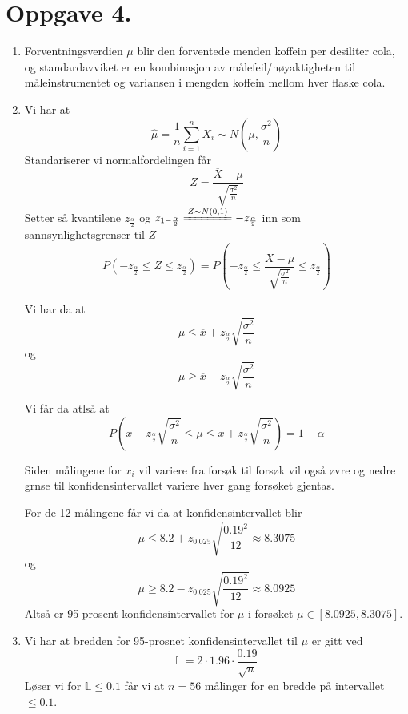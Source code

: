 \documentclass[a4paper,11pt,norsk]{article}
\begin{document}
\section*{Oppgave 4.}
\begin{enumerate}
    \item Forventningsverdien $\mu$ blir den forventede menden koffein per desiliter cola, og standardavviket er en kombinasjon 
        av målefeil/nøyaktigheten til måleinstrumentet og variansen i mengden koffein mellom hver flaske cola.

    \item Vi har at 
        \[
            \hat{\mu} = \frac{1}{n} \sum_{i=1}^{n}{X_i} \sim N\left(\mu, \frac{\sigma^2}{n}\right)
        \]
        Standariserer vi normalfordelingen får 
        \[
            Z = \frac{\overline{X} - \mu}{\sqrt{\frac{\sigma^2}{n}}}
        \]
        Setter så kvantilene $z_{\frac{\alpha}{2}}$ og $z_{1-\frac{\alpha}{2}} \xlongequal{Z \sim N(0, 1)} -z_{\frac{\alpha}{2}}$ inn som sannsynlighetsgrenser til $Z$ 
        \[
            P(-z_{\frac{\alpha}{2}} \leq Z \leq z_{\frac{\alpha}{2}}) = P(-z_{\frac{\alpha}{2}} \leq \frac{\overline{X} - \mu}{\sqrt{\frac{\sigma^2}{n}}} \leq z_{\frac{\alpha}{2}})
        \]

        Vi har da at 
        \[
            \mu \leq \overline{x} + z_{\frac{\alpha}{2}} \sqrt{\frac{\sigma^2}{n}}
        \]
        og 
        \[
            \mu \geq \overline{x} - z_{\frac{\alpha}{2}} \sqrt{\frac{\sigma^2}{n}}
        \]

        Vi får da atlså at 
        \[
            P\left(\overline{x} - z_{\frac{\alpha}{2}} \sqrt{\frac{\sigma^2}{n}} \leq \mu \leq \overline{x} + z_{\frac{\alpha}{2}} \sqrt{\frac{\sigma^2}{n}}\right) = 1 - \alpha
        \]
    
        Siden målingene for $x_i$ vil variere fra forsøk til forsøk vil også øvre og nedre grnse til konfidensintervallet variere hver gang forsøket gjentas.

        For de 12 målingene får vi da at konfidensintervallet blir
        \[
            \mu \leq 8.2 + z_{0.025} \sqrt{\frac{0.19^2}{12}} \approx 8.3075
        \]
        og 
        \[
            \mu \geq 8.2 - z_{0.025} \sqrt{\frac{0.19^2}{12}} \approx 8.0925
        \]
        Altså er 95-prosent konfidensintervallet for $\mu$ i forsøket $\mu \in \left[8.0925, 8.3075\right]$.

    \item Vi har at bredden for 95-prosnet konfidensintervallet til $\mu$ er gitt ved 
        \[
            \mathbb{L} = 2 \cdot 1.96 \cdot \frac{0.19}{\sqrt{n}}
        \]
        Løser vi for $\mathbb{L} \leq 0.1$ får vi at $n = 56$ målinger for en bredde på intervallet $\leq 0.1$.
\end{enumerate}
\end{document}
